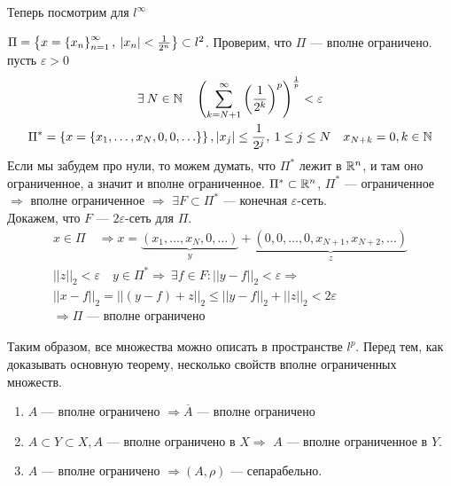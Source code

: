 \documentclass[document]{subfiles}
\begin{document}
Теперь посмотрим для $l^\infty$
\begin{example}
    $ \Pi = \left\{x = \left\{x_n\right\}^\infty_{n=1}, \: |x_n| < \frac{1}{2^n}\right\} \subset l^2$.
    Проверим, что $\Pi$ --- вполне ограничено.
    пусть $\varepsilon > 0 $
    \begin{gather*}
        \exists N \in \bN \quad \left( \sum^\infty_{k=N+1} \left( \frac{1}{2^k} \right)^p \right)^{\frac{1}{p}} < \varepsilon \\
        \Pi^* = \seq{x = \seq{x_1, \ldots, x_N, 0, 0, \ldots}}, |x_j| \leq \frac{1}{2^j}, \: 1 \leq j \leq N \quad x_{N+k} =0, k \in \bN
    \end{gather*}
    Если мы забудем про нули, то можем думать, что $\Pi^*$ лежит в $\mathbb{R}^n$, и там оно ограниченное, а значит и вполне ограниченное.
    $\Pi^* \subset \mathbb{R}^n$, $\Pi^*$ --- ограниченное $\Rightarrow$ вполне ограниченное $\Rightarrow$ 
    $\exists F \subset \Pi^*$ --- конечная $\varepsilon$-сеть. \\
    Докажем, что $F$ --- $2\varepsilon$-сеть для $\Pi$.
    \begin{gather*}
        x \in \Pi \quad \Rightarrow x = \underbrace{(x_1, \ldots, x_N, 0, \ldots)}_y + \underbrace{(0, 0, \ldots, 0, x_{N+1}, x_{N+2}, \ldots)}_z \\
        ||z||_2 < \varepsilon \quad y \in \Pi^* \Rightarrow \: \exists f \in F : ||y - f||_2 < \varepsilon \Rightarrow \\
        ||x - f||_2 = ||(y-f)+z||_2 \leq ||y-f||_2 + ||z||_2 < 2 \varepsilon \\
        \Rightarrow \Pi \text{ --- вполне ограничено }
    \end{gather*}
\end{example}

Таким образом, все множества можно описать в пространстве $l^p$.
Перед тем, как доказывать основную теорему, несколько свойств вполне ограниченных множеств.

\begin{property}
    \begin{enumerate}
        \item $A$ --- вполне ограничено $\Rightarrow \overline{A}$ --- вполне ограничено 
        \item $A \subset Y \subset X, A$  --- вполне ограничено в $X \Rightarrow$  $A$ --- вполне ограниченное в $Y$.
        \item $A$ --- вполне ограничено $\Rightarrow (A, \rho)$ --- сепарабельно.
    \end{enumerate}
\end{property}
\label{chap4:props}
\end{document}
